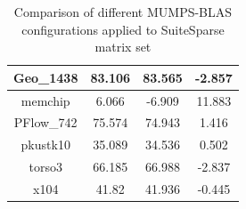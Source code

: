 \begin{table}[h!]
\begin{tabular}{|c|c|c|c|}
Geo\_1438                                             & 83.106                                                                                                  & 83.565                                                                                               & -2.857                                                                                                  \\ \hline
memchip                                               & 6.066                                                                                                   & -6.909                                                                                               & 11.883                                                                                                  \\ \hline
PFlow\_742                                            & 75.574                                                                                                  & 74.943                                                                                               & 1.416                                                                                                   \\ \hline
pkustk10                                              & 35.089                                                                                                  & 34.536                                                                                               & 0.502                                                                                                   \\ \hline
torso3                                                & 66.185                                                                                                  & 66.988                                                                                               & -2.837                                                                                                  \\ \hline
x104                                                  & 41.82                                                                                                   & 41.936                                                                                               & -0.445                                                                                                  \\ \hline
\end{tabular}
\caption{Comparison of different MUMPS-BLAS configurations applied to SuiteSparse matrix set}
\label{table:mumps-blas-performance-gain-suitesprase}
\end{table}



